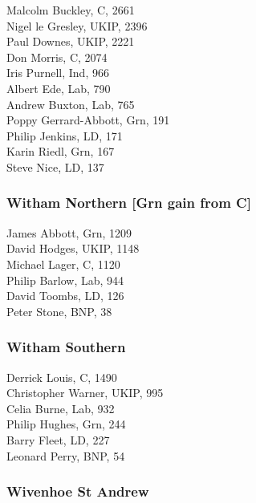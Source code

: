 \documentclass[a4paper,openany,10pt]{book}
\begin{document}


Malcolm Buckley, C, 2661\\
Nigel le Gresley, UKIP, 2396\\
Paul Downes, UKIP, 2221\\
Don Morris, C, 2074\\
Iris Purnell, Ind, 966\\
Albert Ede, Lab, 790\\
Andrew Buxton, Lab, 765\\
{Poppy Gerrard-Abbott}, Grn, 191\\
Philip Jenkins, LD, 171\\
Karin Riedl, Grn, 167\\
Steve Nice, LD, 137\\


\subsubsection*{Witham Northern \hspace*{\fill}\nolinebreak[1]%
\enspace\hspace*{\fill}
[Grn gain from C]}



James Abbott, Grn, 1209\\
David Hodges, UKIP, 1148\\
Michael Lager, C, 1120\\
Philip Barlow, Lab, 944\\
David Toombs, LD, 126\\
Peter Stone, BNP, 38\\


\subsubsection*{Witham Southern}



Derrick Louis, C, 1490\\
Christopher Warner, UKIP, 995\\
Celia Burne, Lab, 932\\
Philip Hughes, Grn, 244\\
Barry Fleet, LD, 227\\
Leonard Perry, BNP, 54\\


\subsubsection*{Wivenhoe St Andrew}
\end{document}
